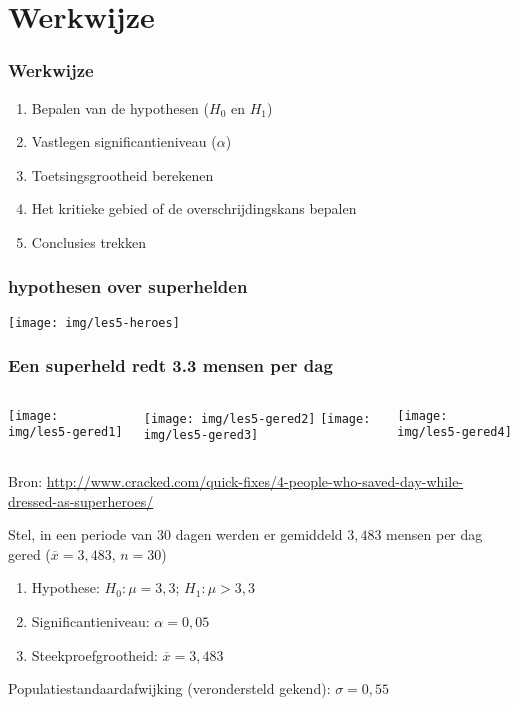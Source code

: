 \documentclass[aspectratio=169]{beamer}
\begin{document}
\section{Werkwijze}

\begin{frame}
  \frametitle{Werkwijze}

  \begin{enumerate}
    \item Bepalen van de hypothesen ($H_0$ en $H_1$)
    \item Vastlegen significantieniveau ($\alpha$)
    \item Toetsingsgrootheid berekenen
    \item Het kritieke gebied of de overschrijdingskans bepalen
    \item Conclusies trekken
  \end{enumerate}
\end{frame}

\begin{frame}[plain]
  \frametitle{hypothesen over superhelden}

  \texttt{[image: img/les5-heroes]}
\end{frame}

\begin{frame}
  \frametitle{Een superheld redt 3.3 mensen per dag}

  \begin{columns}
    \centering
    \texttt{[image: img/les5-gered1]}

    \texttt{[image: img/les5-gered2]}
    \centering
    \texttt{[image: img/les5-gered3]}

    \texttt{[image: img/les5-gered4]}
  \end{columns}

  \vfill
  \centering
  \small{Bron: \url{http://www.cracked.com/quick-fixes/4-people-who-saved-day-while-dressed-as-superheroes/}}
\end{frame}

\begin{frame}
  Stel, in een periode van 30 dagen werden er gemiddeld $3,483$ mensen per dag gered ($\overline{x}=3,483$, $n=30$)
  \vfill
  \begin{enumerate}
    \item Hypothese: $H_0: \mu = 3,3$; $H_1: \mu > 3,3$
    \item Significantieniveau: $\alpha = 0,05$
    \item Steekproefgrootheid: $\overline{x} = 3,483$
  \end{enumerate}
  \vfill
  Populatiestandaardafwijking (verondersteld gekend): $\sigma = 0,55$
\end{frame}
\end{document}
